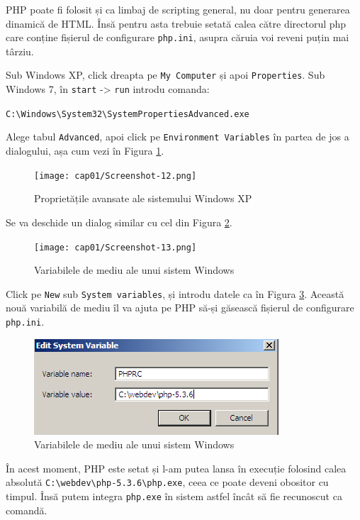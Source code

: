 PHP poate fi folosit și ca limbaj de scripting general, nu doar pentru
generarea dinamică de HTML. Însă pentru asta trebuie setată calea
către directorul php care conține fișierul de configurare \texttt{php.ini},
asupra căruia voi reveni puțin mai târziu.

Sub Windows XP, click dreapta pe \texttt{My Computer} și apoi \texttt{Properties}.
Sub Windows 7, în \texttt{start} -> \texttt{run} introdu comanda:

\texttt{C:{\textbackslash}Windows{\textbackslash}System32{\textbackslash}SystemPropertiesAdvanced.exe}

Alege tabul \texttt{Advanced}, apoi click pe \texttt{Environment Variables} în partea de jos
a dialogului, așa cum vezi în Figura \ref{fig:win adv props}.
\begin{figure}[ht!]
 \centering
   \texttt{[image: cap01/Screenshot-12.png]}
 \caption{Proprietățile avansate ale sistemului Windows XP}
 \label{fig:win adv props}
\end{figure}

Se va deschide un dialog similar cu cel din Figura \ref{img:win env vars}.
\begin{figure}[ht!]
 \centering
   \texttt{[image: cap01/Screenshot-13.png]}
 \caption{Variabilele de mediu ale unui sistem Windows}
 \label{img:win env vars}
\end{figure}

Click pe \texttt{New} sub \texttt{System variables}, și introdu datele ca în
Figura \ref{img:win new env var}. Această nouă variabilă de mediu
îl va ajuta pe PHP să-și găsească fișierul de configurare \texttt{php.ini}.
\begin{figure}[ht!]
 \centering
   \includegraphics[width=180bp]{cap01/Screenshot-14.png}
 \caption{Variabilele de mediu ale unui sistem Windows}
 \label{img:win new env var}
\end{figure}

În acest moment, PHP este setat și l-am putea lansa în execuție folosind
calea absolută
\texttt{C:{\textbackslash}webdev{\textbackslash}php-5.3.6{\textbackslash}php.exe}, ceea ce
poate deveni obositor cu timpul. Însă putem integra \texttt{php.exe}
în sistem astfel încât să fie recunoscut ca comandă.


